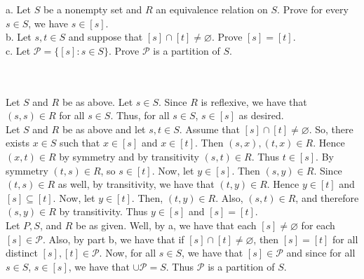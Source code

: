 a. Let $S$ be a nonempty set and $R$ an equivalence relation on $S$. Prove for every $s\in S$, we have
$s\in[s]$.\\

b. Let $s,t\in S$ and suppose that $[s]\cap[t]\neq\varnothing$. Prove $[s]=[t]$.\\

c. Let $\mathcal{P}=\{[s]:s\in S\}$. Prove $\mathcal{P}$ is a partition of $S$.\\\\

\begin{solution}\renewcommand{\qedsymbol}{}\ \\
    Let $S$ and $R$ be as above. Let $s\in S$. Since $R$ is reflexive, we have that $(s,s)\in R$ for all
    $s\in S$. Thus, for all $s\in S$, $s\in[s]$ as desired.\\

    Let $S$ and $R$ be as above and let $s,t\in S$. Assume that $[s]\cap[t]\neq\varnothing$. So, there
    exists $x\in S$ such that $x\in[s]$ and $x\in[t]$. Then $(s,x),(t,x)\in R$. Hence $(x,t)\in R$ by
    symmetry and by transitivity $(s,t)\in R$. Thus $t\in[s]$. By symmetry $(t,s)\in R$, so $s\in[t]$.
    Now, let $y\in[s]$. Then $(s,y)\in R$. Since $(t,s)\in R$ as well, by transitivity, we have that
    $(t,y)\in R$. Hence $y\in[t]$ and $[s]\subseteq[t]$. Now, let $y\in[t]$. Then, $(t,y)\in R$. Also,
    $(s,t)\in R$, and therefore $(s,y)\in R$ by transitivity. Thus $y\in[s]$ and $[s]=[t]$.\\

    Let $P, S$, and $R$ be as given. Well, by a, we have that each $[s]\neq\varnothing$ for each
    $[s]\in\mathcal{P}$. Also, by part b, we have that if $[s]\cap[t]\neq\varnothing$, then $[s]=[t]$
    for all distinct $[s],[t]\in\mathcal{P}$. Now, for all $s\in S$, we have that $[s]\in\mathcal{P}$
    and since for all $s\in S$, $s\in[s]$, we have that $\cup\mathcal{P}=S$. Thus $\mathcal{P}$ is a
    partition of $S$.

\end{solution}